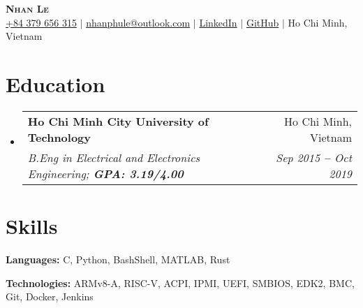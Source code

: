 \documentclass[letterpaper,11pt]{article}
\makeatletter
\newcommand{\resumeEducationHeading}[4]{
  \vspace{-2pt}\item
    \begin{tabular*}{0.97\textwidth}[t]{l@{\extracolsep{\fill}}r}
      \textbf{#1} & #2 \\
      \textit{\small#3} & \textit{\small #4} \\
    \end{tabular*}\vspace{-5pt}
}
\newcommand{\resumeSubHeadingListStart}{\begin{itemize}[leftmargin=0.15in, label={}]}
\newcommand{\resumeSubHeadingListEnd}{\end{itemize}}
\makeatother
\begin{document}

\begin{center}
    \textbf{\Huge \scshape Nhan Le} \\ \vspace{3pt}
    \small
    \faMobile \hspace{.5pt} \href{tel:+84379656315}{+84 379 656 315}
    $|$
    \faAt \hspace{.5pt} \href{mailto:nhanphule@outlook.com}{nhanphule@outlook.com}
    $|$
    \faLinkedinSquare \hspace{.5pt} \href{https://www.linkedin.com/in/nhanlephu}{LinkedIn}
    $|$
    \faGithub \hspace{.5pt} \href{https://github.com/nhanplee}{GitHub}
    $|$
    \faMapMarker \hspace{.5pt} {Ho Chi Minh, Vietnam}
\end{center}




\section{Education}
  \vspace{3pt}
  \resumeSubHeadingListStart
    \resumeEducationHeading
      {Ho Chi Minh City University of Technology}{Ho Chi Minh, Vietnam}
      {B.Eng in Electrical and Electronics Engineering; \textbf{GPA: 3.19/4.00}}{Sep 2015 \textbf{--} Oct 2019}
  \resumeSubHeadingListEnd




\section{Skills}
  \vspace{2pt}
  \resumeSubHeadingListStart
    \small{\item{
        
        \textbf{Languages:}{ C, Python, BashShell, MATLAB, Rust} \\ \vspace{3pt}
        
        \textbf{Technologies:}{ ARMv8-A, RISC-V, ACPI, IPMI, UEFI, SMBIOS, EDK2, BMC, Git, Docker, Jenkins} \\ \vspace{3pt}
        
    }}
  \resumeSubHeadingListEnd
\end{document}
